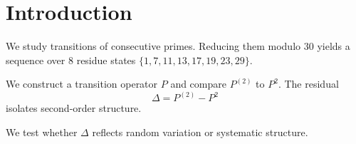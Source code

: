 \section{Introduction}

We study transitions of consecutive primes. Reducing them modulo $30$ yields a sequence over 8 residue states $\{1,7,11,13,17,19,23,29\}$.

We construct a transition operator $P$ and compare $P^{(2)}$ to $P^2$. The residual
\[
\Delta = P^{(2)} - P^2
\]
isolates second-order structure.

We test whether $\Delta$ reflects random variation or systematic structure.